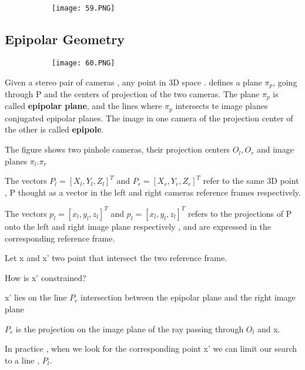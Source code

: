 \documentclass{article}
\begin{document}
\begin{figure}[ht!]
  \centering
  \begin{subfigure}[b]{0.7\linewidth}
    \texttt{[image: 59.PNG]}
  \end{subfigure}
\end{figure}

\vspace{80mm}

\subsection{Epipolar Geometry}

\begin{figure}[ht!]
  \centering
  \begin{subfigure}[b]{0.7\linewidth}
    \texttt{[image: 60.PNG]}
  \end{subfigure}
\end{figure}

Given a stereo pair of cameras , any point in 3D space . defines a plane $\pi_p$, going through P and the centers of projection of the two cameras. The plane $\pi_p$ is called \textbf{epipolar plane}, and the lines where $\pi_p$ intersects te image planes conjugated epipolar planes. The image in one camera of the projection center of the other is called \textbf{epipole}.

The figure shows two pinhole cameras, their projection centers $O_l , O_r$ and image planes $\pi_l . \pi_r$

The vectors $P_l = [X_l,Y_l,Z_l]^T$ and $P_r = [X_r,Y_r,Z_r]^T$ refer to the same 3D point , P thought as a vector in the left and right cameras reference frames respectively. 

The vectors $p_l = [x_l,y_l,z_l]^T$ and $p_l = [x_l,y_l,z_l]^T$ refers to the projections of P onto the left and right image plane respectively , and are expressed in the corresponding reference frame.

Let x and x' two point that intersect the two reference frame.

How is x' constrained?

x' lies on the line $P_r$ intersection between the epipolar plane and the right image plane

$P_r$ is the projection on the image plane of the ray passing through $O_l$ and x.

In practice , when we look for the corresponding point x' we can limit our search to a line , $P_l$.
\end{document}
